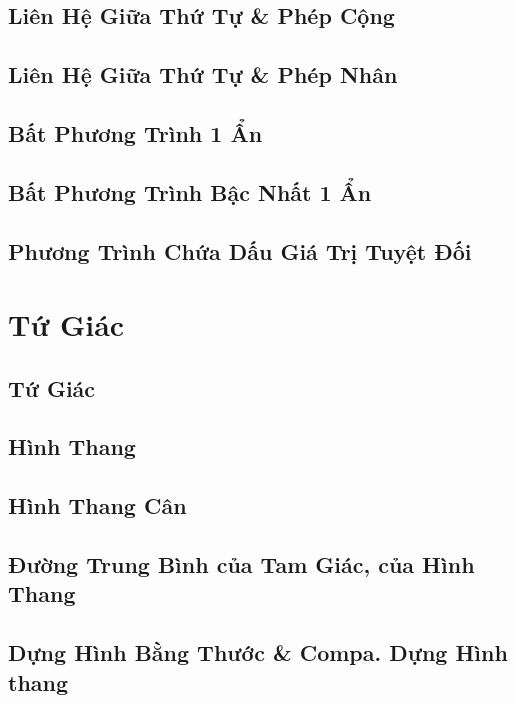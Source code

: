 \documentclass{article}
\numberwithin{equation}{section}
\begin{document}
\subsection{Liên Hệ Giữa Thứ Tự \& Phép Cộng}

\subsection{Liên Hệ Giữa Thứ Tự \& Phép Nhân}

\subsection{Bất Phương Trình 1 Ẩn}

\subsection{Bất Phương Trình Bậc Nhất 1 Ẩn}

\subsection{Phương Trình Chứa Dấu Giá Trị Tuyệt Đối}


\section{Tứ Giác}

\subsection{Tứ Giác}

\subsection{Hình Thang}

\subsection{Hình Thang Cân}

\subsection{Đường Trung Bình của Tam Giác, của Hình Thang}

\subsection{Dựng Hình Bằng Thước \& Compa. Dựng Hình thang}
\end{document}
